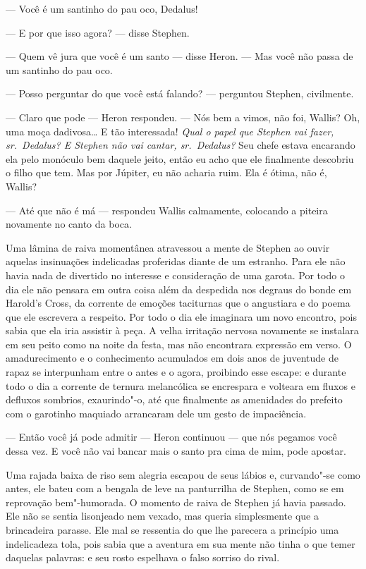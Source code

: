  --- Você é um santinho do pau oco, Dedalus!

 --- E por que isso agora? --- disse Stephen.

 --- Quem vê jura que você é um santo --- disse Heron. --- Mas você não passa de
um santinho do pau oco.

 --- Posso perguntar do que você está falando? --- perguntou Stephen,
civilmente.

 --- Claro que pode --- Heron respondeu. --- Nós bem a vimos, não foi, Wallis? Oh,
uma moça dadivosa\ldots{} E tão interessada! \textit{Qual o papel que
Stephen vai fazer, sr.~Dedalus? E Stephen não vai cantar, sr.~Dedalus?}
Seu chefe estava encarando ela pelo monóculo bem daquele jeito, então 
eu acho que ele finalmente descobriu o filho que tem. Mas por Júpiter,
eu não acharia ruim. Ela é ótima, não é, Wallis?

 --- Até que não é má --- respondeu Wallis calmamente, colocando a piteira
novamente no canto da boca.

Uma lâmina de raiva momentânea atravessou a mente de Stephen ao ouvir
aquelas insinuações indelicadas proferidas diante de um estranho. Para
ele não havia nada de divertido no interesse e consideração de uma
garota. Por todo o dia ele não pensara em outra coisa além da despedida
nos degraus do bonde em Harold’s Cross, da corrente de
emoções taciturnas que o angustiara e do poema que ele escrevera a
respeito. Por todo o dia ele imaginara um novo encontro, pois sabia que
ela iria assistir à peça. A velha irritação nervosa novamente se
instalara em seu peito como na noite da festa, mas não encontrara
expressão em verso. O amadurecimento e o conhecimento acumulados em
dois anos de juventude de rapaz se interpunham entre o antes e o
agora, proibindo esse escape: e durante todo o dia a corrente de
ternura melancólica se encrespara e volteara em fluxos e defluxos
sombrios, exaurindo"-o, até que finalmente as amenidades do prefeito com
o garotinho maquiado arrancaram dele um gesto de impaciência.

 --- Então você já pode admitir --- Heron continuou --- que nós pegamos você
dessa vez. E você não vai bancar mais o santo pra cima de mim, pode
apostar.

Uma rajada baixa de riso sem alegria escapou de seus lábios e,
curvando"-se como antes, ele bateu com a bengala de leve na panturrilha
de Stephen, como se em reprovação bem"-humorada. O momento de raiva de
Stephen já havia passado. Ele não se sentia lisonjeado nem vexado, mas
queria simplesmente que a brincadeira parasse. Ele mal se ressentia do
que lhe parecera a princípio uma indelicadeza tola, pois sabia que a
aventura em sua mente não tinha o que temer daquelas palavras: e seu
rosto espelhava o falso sorriso do rival.

